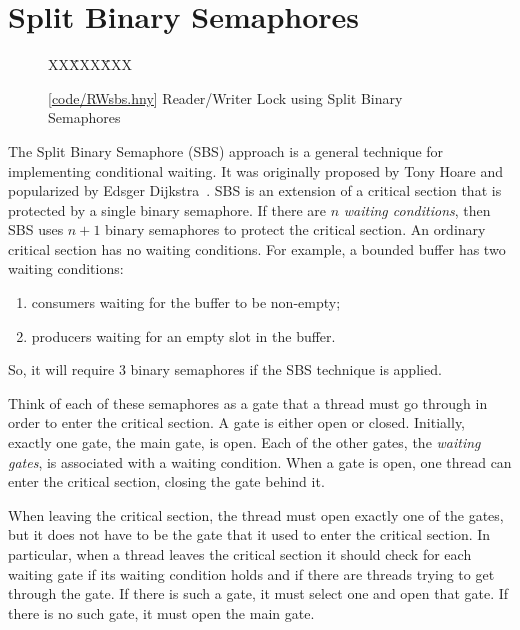 \documentclass{report}
\newcommand{\harmonysource}[1]{
\begin{tabbing}
XX\=XXX\=XXX\kill
    
\end{tabbing}
}
\newcommand{\harmonylink}[1]{%
[\href{https://harmony.cs.cornell.edu/#1}{\underline{#1}}]%
}
\newenvironment{code}{
\tcolorbox
}{
\endtcolorbox
}
\begin{document}
\chapter{Split Binary Semaphores}
\label{ch:sbs}
%

\begin{figure}
\begin{code}
\harmonysource{RWsbs}
\end{code}
\caption{\harmonylink{code/RWsbs.hny} Reader/Writer Lock using Split Binary Semaphores}
\label{fig:RWsplitsema}
\end{figure}

%

The Split Binary Semaphore (SBS) approach is a general technique for
implementing conditional waiting.  It was originally proposed by
Tony Hoare and popularized by Edsger Dijkstra~\cite{EWD703}.
SBS is an extension of a critical section that is protected by a single
binary semaphore.
If there are $n$ \emph{waiting conditions},
then SBS uses $n+1$ binary semaphores to protect the critical section.
An ordinary critical section has no waiting conditions.
For example, a bounded buffer has two waiting conditions:
\begin{enumerate}
\item consumers waiting for the buffer to be non-empty;
\item producers waiting for an empty slot in the buffer.
\end{enumerate}
So, it will require 3 binary semaphores if the SBS technique is applied.

Think of each of these semaphores as a gate that a thread must go
through in order to enter the critical section.  A gate is either open
or closed.  Initially, exactly one gate, the main gate, is open.
Each of the other gates, the \emph{waiting gates}, is associated with a
waiting condition.
When a gate is open, one thread can enter the critical section,
closing the gate behind it.

When leaving the critical section, the thread must open exactly one
of the gates, but it does not have to be the gate that it used to enter
the critical section.
In particular, when a thread leaves the critical section it should
check for each waiting gate if its waiting condition holds and if there are
threads trying to get through the gate.  If there is such a gate,
it must select one and open that gate.  If there is no such gate,
it must open the main gate.
\end{document}
